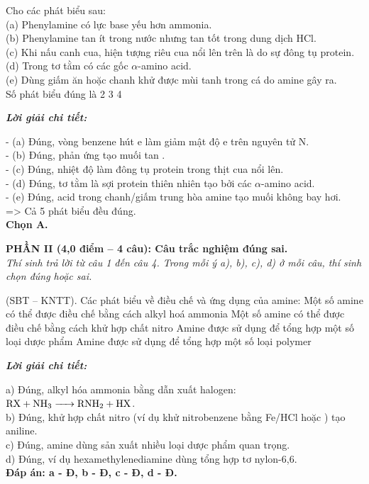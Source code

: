 \documentclass[11pt,a4paper]{article}
\def\loigiai#1{
\par\begingroup\color{blue!80!black}\small
\noindent\textbf{\textit{Lời giải chi tiết:}}\par
#1\par\endgroup}
\begin{document}
\begin{ex}
Cho các phát biểu sau:\\
(a) Phenylamine có lực base yếu hơn ammonia.\\
(b) Phenylamine tan ít trong nước nhưng tan tốt trong dung dịch HCl.\\
(c) Khi nấu canh cua, hiện tượng riêu cua nổi lên trên là do sự đông tụ protein.\\
(d) Trong tơ tằm có các gốc $\alpha$-amino acid.\\
(e) Dùng giấm ăn hoặc chanh khử được mùi tanh trong cá do amine gây ra.\\
Số phát biểu đúng là
\choice
{}
{2}
{3}
{4}
\loigiai{
- (a) Đúng, vòng benzene hút e làm giảm mật độ e trên nguyên tử N.\\
- (b) Đúng, phản ứng tạo muối tan \ce{C6H5NH3Cl}.\\
- (c) Đúng, nhiệt độ làm đông tụ protein trong thịt cua nổi lên.\\
- (d) Đúng, tơ tằm là sợi protein thiên nhiên tạo bởi các $\alpha$-amino acid.\\
- (e) Đúng, acid trong chanh/giấm trung hòa amine tạo muối không bay hơi.\\
=> Cả 5 phát biểu đều đúng.\\
\textbf{Chọn A.}}
\end{ex}




\vspace{0.15cm}
\noindent
\textbf{PHẦN II (4,0 điểm -- 4 câu): Câu trắc nghiệm đúng sai.}\\
\textit{Thí sinh trả lời từ câu 1 đến câu 4. Trong mỗi ý a), b), c), d) ở mỗi câu, thí sinh chọn đúng hoặc sai.}

\setcounter{ex}{0}

\begin{ex}
(SBT -- KNTT). Các phát biểu về điều chế và ứng dụng của amine:
\choiceTF
{\True Một số amine có thể được điều chế bằng cách alkyl hoá ammonia}
{\True Một số amine có thể được điều chế bằng cách khử hợp chất nitro}
{\True Amine được sử dụng để tổng hợp một số loại dược phẩm}
{\True Amine được sử dụng để tổng hợp một số loại polymer}
\loigiai{
a) Đúng, alkyl hóa ammonia bằng dẫn xuất halogen: $\ce{RX + NH3 -> RNH2 + HX}$.\\
b) Đúng, khử hợp chất nitro (ví dụ khử nitrobenzene bằng Fe/HCl hoặc \ce{H2/Ni}) tạo aniline.\\
c) Đúng, amine dùng sản xuất nhiều loại dược phẩm quan trọng.\\
d) Đúng, ví dụ hexamethylenediamine dùng tổng hợp tơ nylon-6,6.\\
\textbf{Đáp án: a - Đ, b - Đ, c - Đ, d - Đ.}}
\end{ex}
\end{document}

